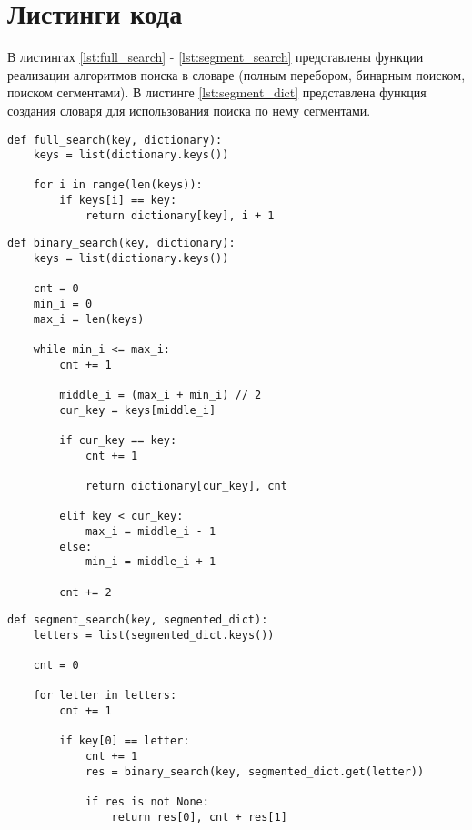 \documentclass[a4paper,14pt, unknownkeysallowed]{extreport}
\begin{document}
\section{Листинги кода}

В листингах \ref{lst:full_search} - \ref{lst:segment_search} представлены функции реализации алгоритмов поиска в словаре (полным перебором, бинарным поиском, поиском сегментами). В листинге \ref{lst:segment_dict}
представлена функция создания словаря для использования поиска по нему сегментами.

\begin{center} 
\captionsetup{justification=raggedright,singlelinecheck=off}
\begin{lstlisting}[label=lst:full_search,caption=Алгоритм поиска полным перебором]
def full_search(key, dictionary):
    keys = list(dictionary.keys())

    for i in range(len(keys)):
        if keys[i] == key:
            return dictionary[key], i + 1
\end{lstlisting}
\end{center}	


\begin{center}
\captionsetup{justification=raggedright,singlelinecheck=off}
\begin{lstlisting}[label=lst:binary_search,caption=Алгоритм бинарного поиска]
def binary_search(key, dictionary):
    keys = list(dictionary.keys())

    cnt = 0
    min_i = 0
    max_i = len(keys)

    while min_i <= max_i:
        cnt += 1

        middle_i = (max_i + min_i) // 2
        cur_key = keys[middle_i]

        if cur_key == key:
            cnt += 1

            return dictionary[cur_key], cnt

        elif key < cur_key:
            max_i = middle_i - 1
        else:
            min_i = middle_i + 1

        cnt += 2
\end{lstlisting}
\end{center}

\clearpage

\begin{center}
\captionsetup{justification=raggedright,singlelinecheck=off}
\begin{lstlisting}[label=lst:segment_search,caption=Алгоритм поиска сегментами]
def segment_search(key, segmented_dict):
    letters = list(segmented_dict.keys())

    cnt = 0

    for letter in letters:
        cnt += 1  

        if key[0] == letter:
            cnt += 1  
            res = binary_search(key, segmented_dict.get(letter))

            if res is not None:
                return res[0], cnt + res[1]
\end{lstlisting}
\end{center}	
\end{document}
